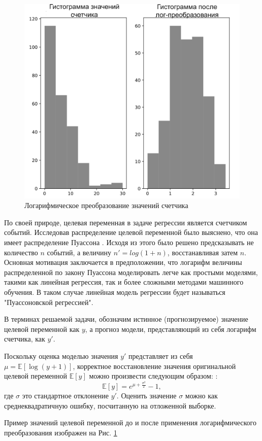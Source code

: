 \begin{figure}[t]
  \centering
  \includegraphics[width=0.45\linewidth]{images/log_hist}
  \caption{Логарифмическое преобразование значений счетчика}
  \label{fig:log_hist}
\end{figure}

По своей природе, целевая переменная в задаче регрессии является счетчиком событий. Исследовав распределение целевой переменной было выяснено, что она имеет распределение Пуассона \cite{pois_handbook}. Исходя из этого было решено предсказывать не количество $n$ событий, а величину $n' = log(1+n)$, восстанавливая затем $n$. Основная мотивация заключается в предположении, что логарифм величины распределенной по закону Пуассона моделировать легче как простыми моделями, такими как линейная регрессия, так и более сложными методами машинного обучения. В таком случае линейная модель регрессии будет называться "Пуассоновской регрессией".

В терминах решаемой задачи, обозначим истинное (прогнозируемое) значение целевой переменной как $y$, а прогноз модели, представляющий из себя логарифм счетчика, как $y'$.

Поскольку оценка моделью значения $y'$ представляет из себя $\mu = \mathbb{E}[\log(y+1)]$, корректное восстановление значения оригинальной целевой переменной $\mathbb{E}[y]$ можно произвести следующим образом: \cite{lognormal}:
$$\mathbb{E}[y]=e^{{\mu + \frac{\sigma ^{2}}{2}}} - 1,$$
где $\sigma$ это стандартное отклонение $y'$. Оценить значение $\sigma$ можно как среднеквадратичную ошибку, посчитанную на отложенной выборке.

Пример значений целевой переменной до и после применения логарифмического преобразования изображен на Рис. \ref{fig:log_hist}

